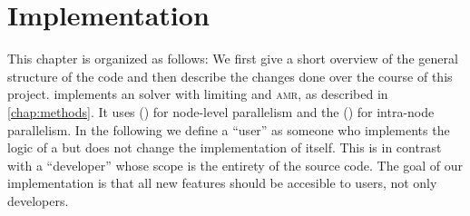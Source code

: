\chapter{Implementation}\label{chap:implementation}
This chapter is organized as follows:
We first give a short overview of the general structure of the \exahype{} code and then describe the changes done over the course of this project.
\exahype{} implements an \aderdg{} solver with \muscl{} limiting and \textsc{amr}, as described in \cref{chap:methods}.
It uses  (\tbb{}) for node-level parallelism and the  (\mpi{}) for intra-node parallelism. 
In the following we define a \enquote{user} as someone who implements the logic of a \pde{} but does not change the implementation of \exahype{} itself.
This is in contrast with a \enquote{developer} whose scope is the entirety of the source code.
The goal of our implementation is that all new features should be accesible to users, not only developers.

